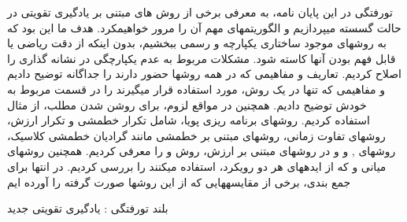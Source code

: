 


\pagestyle{empty}

‌تورفتگی
 در این پایان نامه، به معرفی برخی از روش های مبتنی بر یادگیری تقویتی در حالت گسسته می\nf پردازیم و الگوریتم\nf های مهم آن را مرور خواهیم\nf کرد. 
هدف ما این بود که به روش\nf های موجود ساختاری یکپارچه و رسمی ببخشیم،
 بدون اینکه از دقت ریاضی یا قابل فهم بودن آن\nf ها کاسته شود.
 مشکلات مربوط به عدم یکپارچگی در نشانه گذاری را اصلاح کردیم.
 تعاریف و مفاهیمی که در همه روش\nf ها حضور دارند را جداگانه توضیح دادیم و مفاهیمی که تنها در یک روش، مورد استفاده قرار می\nf گیرند را در قسمت مربوط به خودش توضیح دادیم.
همچنین در مواقع لزوم، برای روشن شدن مطلب، از مثال استفاده کردیم.
روش\nf های برنامه ریزی پویا، شامل تکرار خط\nf مشی و تکرار ارزش، روش\nf های تفاوت زمانی، روش\nf های مبتنی بر خط\nf مشی مانند گرادیان خط\nf مشی کلاسیک، روش\nf های 
,
و
و در روش\nf های مبتنی بر ارزش، روش
و
را معرفی کردیم. همچنین روش\nf های میانی 
و
که از ایده\nf های هر دو رویکرد، استفاده می\nf کنند را بررسی کردیم.
در انتها برای جمع بندی، برخی از مقایسه\nf هایی که از این روش\nf ها صورت گرفته را آورده ایم

‌بلند
‌تورفتگی : 
یادگیری تقویتی
‌جدید
